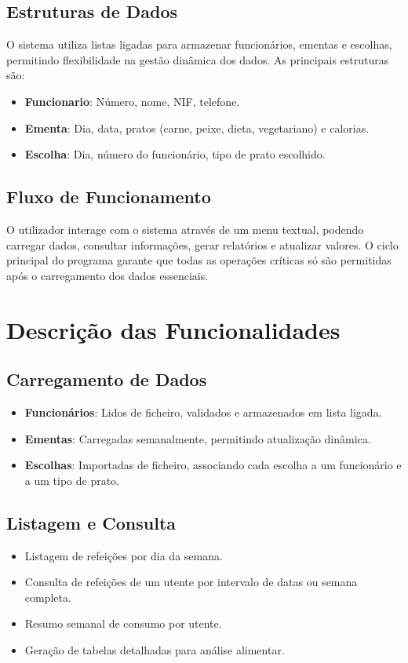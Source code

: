 \documentclass[a4paper,12pt]{report}
\begin{document}
\section{Estruturas de Dados}
O sistema utiliza listas ligadas para armazenar funcionários, ementas e escolhas, permitindo flexibilidade na gestão dinâmica dos dados. As principais estruturas são:
\begin{itemize}
    \item \textbf{Funcionario}: Número, nome, NIF, telefone.
    \item \textbf{Ementa}: Dia, data, pratos (carne, peixe, dieta, vegetariano) e calorias.
    \item \textbf{Escolha}: Dia, número do funcionário, tipo de prato escolhido.
\end{itemize}

\section{Fluxo de Funcionamento}
O utilizador interage com o sistema através de um menu textual, podendo carregar dados, consultar informações, gerar relatórios e atualizar valores. O ciclo principal do programa garante que todas as operações críticas só são permitidas após o carregamento dos dados essenciais.

\chapter{Descrição das Funcionalidades}
\section{Carregamento de Dados}
\begin{itemize}
    \item \textbf{Funcionários}: Lidos de ficheiro, validados e armazenados em lista ligada.
    \item \textbf{Ementas}: Carregadas semanalmente, permitindo atualização dinâmica.
    \item \textbf{Escolhas}: Importadas de ficheiro, associando cada escolha a um funcionário e a um tipo de prato.
\end{itemize}

\section{Listagem e Consulta}
\begin{itemize}
    \item Listagem de refeições por dia da semana.
    \item Consulta de refeições de um utente por intervalo de datas ou semana completa.
    \item Resumo semanal de consumo por utente.
    \item Geração de tabelas detalhadas para análise alimentar.
\end{itemize}
\end{document}
